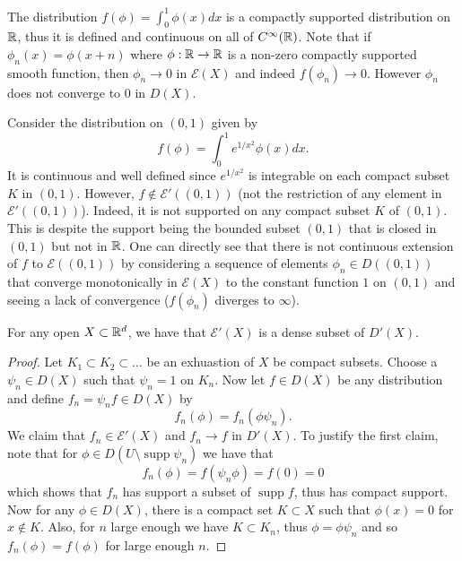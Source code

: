 \documentclass[twoside, a4paper, 10pt]{amsart}
\begin{document}
\begin{eg} The distribution $f(\phi) = \int_{0}^1 \phi(x) dx $ is a compactly supported distribution on $\mathbb{R}$, thus it is defined and continuous on all of $C^{\infty}(\mathbb{R})$. Note that if $\phi_n(x) = \phi(x+n)$ where $\phi:\mathbb{R} \to \mathbb{R}$ is a non-zero compactly supported smooth function, then $\phi_n \to 0$ in $\mathcal{E}(X)$ and indeed $f(\phi_n) \to 0$. However $\phi_n$ does not converge to $0$ in $D(X)$.

\end{eg}

\begin{eg} Consider the distribution on $(0,1)$ given by $$f(\phi) = \int_{0}^1 e^{1/x^2} \phi(x) dx.$$ It is continuous and well defined since $e^{1/x^2}$ is integrable on each compact subset $K$ in $(0,1)$. However, $f \notin \mathcal{E}'((0,1))$ (not the restriction of any element in $\mathcal{E}'((0,1))$). Indeed, it is not supported on any compact subset $K$ of $(0,1)$. This is despite the support being the bounded subset $(0,1)$ that is closed in $(0,1)$ but not in $\mathbb{R}$. One can directly see that there is not continuous extension of $f$ to $\mathcal{E}((0,1))$ by considering a sequence of elements $\phi_n \in D((0,1))$ that converge monotonically in $\mathcal{E}(X)$ to the constant function $1$ on $(0,1)$ and seeing a lack of convergence ($f(\phi_n)$ diverges to $\infty$).

\end{eg}

\begin{thm} For any open $X \subset \mathbb{R}^d$, we have that $\mathcal{E}'(X)$ is a dense subset of $D'(X)$.

\end{thm}

\begin{proof} Let $K_1 \subset K_2 \subset \ldots $ be an exhuastion of $X$ be compact subsets. Choose a $\psi_n \in D(X)$ such that $\psi_n = 1$ on $K_n$. Now let $f \in D(X)$ be any distribution and define $f_n = \psi_n f \in D(X)$ by $$f_n(\phi) = f_n(\phi \psi_n).$$ We claim that $f_n \in \mathcal{E}'(X)$ and $f_n \to f$ in $D'(X)$. To justify the first claim, note that for $\phi \in D(U \setminus \operatorname{supp} \psi_n)$ we have that $$f_n(\phi) = f(\psi_n \phi) = f(0) = 0$$ which shows that $f_n$ has support a subset of $\operatorname{supp} f$, thus has compact support. Now for any $\phi \in D(X)$, there is a compact set $K \subset X$ such that $\phi(x) = 0$ for $x \notin K$. Also, for $n$ large enough we have $K \subset K_n$, thus $\phi = \phi \psi_n$ and so $f_n(\phi) = f(\phi)$ for large enough $n$. \end{proof}
\end{document}
